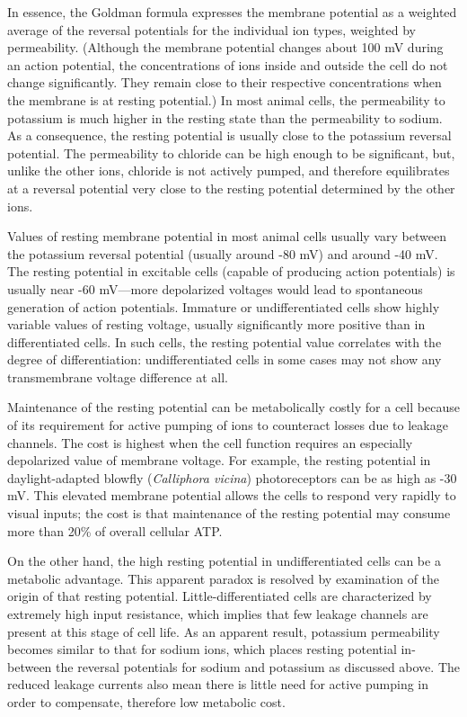 In essence, the Goldman formula expresses the membrane potential as a weighted average of the reversal potentials for the individual ion types, weighted by permeability. (Although the membrane potential changes about 100 mV during an action potential, the concentrations of ions inside and outside the cell do not change significantly. They remain close to their respective concentrations when the membrane is at resting potential.) In most animal cells, the permeability to potassium is much higher in the resting state than the permeability to sodium. As a consequence, the resting potential is usually close to the potassium reversal potential. The permeability to chloride can be high enough to be significant, but, unlike the other ions, chloride is not actively pumped, and therefore equilibrates at a reversal potential very close to the resting potential determined by the other ions.

Values of resting membrane potential in most animal cells usually vary between the potassium reversal potential (usually around -80 mV) and around -40 mV. The resting potential in excitable cells (capable of producing action potentials) is usually near -60 mV---more depolarized voltages would lead to spontaneous generation of action potentials. Immature or undifferentiated cells show highly variable values of resting voltage, usually significantly more positive than in differentiated cells. In such cells, the resting potential value correlates with the degree of differentiation: undifferentiated cells in some cases may not show any transmembrane voltage difference at all.

Maintenance of the resting potential can be metabolically costly for a cell because of its requirement for active pumping of ions to counteract losses due to leakage channels. The cost is highest when the cell function requires an especially depolarized value of membrane voltage. For example, the resting potential in daylight-adapted blowfly (\emph{Calliphora vicina}) photoreceptors can be as high as -30 mV. This elevated membrane potential allows the cells to respond very rapidly to visual inputs; the cost is that maintenance of the resting potential may consume more than 20\% of overall cellular ATP.

On the other hand, the high resting potential in undifferentiated cells can be a metabolic advantage. This apparent paradox is resolved by examination of the origin of that resting potential. Little-differentiated cells are characterized by extremely high input resistance, which implies that few leakage channels are present at this stage of cell life. As an apparent result, potassium permeability becomes similar to that for sodium ions, which places resting potential in-between the reversal potentials for sodium and potassium as discussed above. The reduced leakage currents also mean there is little need for active pumping in order to compensate, therefore low metabolic cost.

